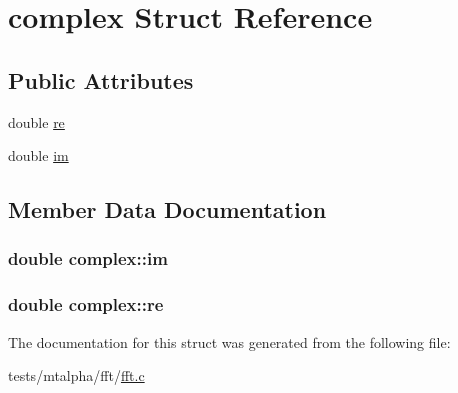\hypertarget{structcomplex}{\section{complex Struct Reference}
\label{structcomplex}
}
\subsection*{Public Attributes}
\begin{DoxyCompactItemize}
\item 
double \hyperlink{structcomplex_a89c5abf606f901c8fdc3ff4a75a5c481}{re}
\item 
double \hyperlink{structcomplex_abf4f2edf3802189a09e78b6f3a50494f}{im}
\end{DoxyCompactItemize}


\subsection{Member Data Documentation}
\hypertarget{structcomplex_abf4f2edf3802189a09e78b6f3a50494f}{
\subsubsection[{im}]{\setlength{\rightskip}{0pt plus 5cm}double complex\+::im}}\label{structcomplex_abf4f2edf3802189a09e78b6f3a50494f}
\hypertarget{structcomplex_a89c5abf606f901c8fdc3ff4a75a5c481}{
\subsubsection[{re}]{\setlength{\rightskip}{0pt plus 5cm}double complex\+::re}}\label{structcomplex_a89c5abf606f901c8fdc3ff4a75a5c481}


The documentation for this struct was generated from the following file\+:\begin{DoxyCompactItemize}
\item 
tests/mtalpha/fft/\hyperlink{mtalpha_2fft_2fft_8c}{fft.\+c}\end{DoxyCompactItemize}
